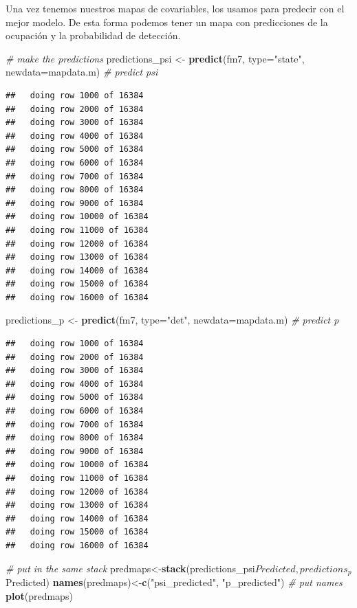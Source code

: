 \documentclass[]{book}
\newenvironment{Shaded}{\begin{snugshade}}{\end{snugshade}}
\newcommand{\KeywordTok}[1]{\textcolor[rgb]{0.13,0.29,0.53}{\textbf{{#1}}}}
\newcommand{\DataTypeTok}[1]{\textcolor[rgb]{0.13,0.29,0.53}{{#1}}}
\newcommand{\StringTok}[1]{\textcolor[rgb]{0.31,0.60,0.02}{{#1}}}
\newcommand{\CommentTok}[1]{\textcolor[rgb]{0.56,0.35,0.01}{\textit{{#1}}}}
\newcommand{\NormalTok}[1]{{#1}}
\begin{document}
Una vez tenemos nuestros mapas de covariables, los usamos para predecir
con el mejor modelo. De esta forma podemos tener un mapa con
predicciones de la ocupación y la probabilidad de detección.

\begin{Shaded}
\begin{Highlighting}[]
\CommentTok{# make the predictions }
\NormalTok{predictions_psi <-}\StringTok{ }\KeywordTok{predict}\NormalTok{(fm7, }\DataTypeTok{type=}\StringTok{"state"}\NormalTok{, }\DataTypeTok{newdata=}\NormalTok{mapdata.m) }\CommentTok{# predict psi}
\end{Highlighting}
\end{Shaded}

\begin{verbatim}
##   doing row 1000 of 16384 
##   doing row 2000 of 16384 
##   doing row 3000 of 16384 
##   doing row 4000 of 16384 
##   doing row 5000 of 16384 
##   doing row 6000 of 16384 
##   doing row 7000 of 16384 
##   doing row 8000 of 16384 
##   doing row 9000 of 16384 
##   doing row 10000 of 16384 
##   doing row 11000 of 16384 
##   doing row 12000 of 16384 
##   doing row 13000 of 16384 
##   doing row 14000 of 16384 
##   doing row 15000 of 16384 
##   doing row 16000 of 16384
\end{verbatim}

\begin{Shaded}
\begin{Highlighting}[]
\NormalTok{predictions_p   <-}\StringTok{ }\KeywordTok{predict}\NormalTok{(fm7, }\DataTypeTok{type=}\StringTok{"det"}\NormalTok{,   }\DataTypeTok{newdata=}\NormalTok{mapdata.m) }\CommentTok{# predict p}
\end{Highlighting}
\end{Shaded}

\begin{verbatim}
##   doing row 1000 of 16384 
##   doing row 2000 of 16384 
##   doing row 3000 of 16384 
##   doing row 4000 of 16384 
##   doing row 5000 of 16384 
##   doing row 6000 of 16384 
##   doing row 7000 of 16384 
##   doing row 8000 of 16384 
##   doing row 9000 of 16384 
##   doing row 10000 of 16384 
##   doing row 11000 of 16384 
##   doing row 12000 of 16384 
##   doing row 13000 of 16384 
##   doing row 14000 of 16384 
##   doing row 15000 of 16384 
##   doing row 16000 of 16384
\end{verbatim}

\begin{Shaded}
\begin{Highlighting}[]
\CommentTok{# put in the same stack}
\NormalTok{predmaps<-}\KeywordTok{stack}\NormalTok{(predictions_psi$Predicted,predictions_p$Predicted) }
\KeywordTok{names}\NormalTok{(predmaps)<-}\KeywordTok{c}\NormalTok{(}\StringTok{"psi_predicted"}\NormalTok{, }\StringTok{"p_predicted"}\NormalTok{) }\CommentTok{# put names}
\KeywordTok{plot}\NormalTok{(predmaps)}
\end{Highlighting}
\end{Shaded}
\end{document}
